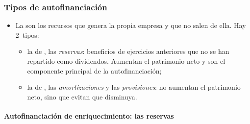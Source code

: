\documentclass[11pt]{article}
\begin{document}
\subsubsection{Tipos de autofinanciación}\label{sec:tipos-autofinanciacion}

\begin{itemize}
\item La  son los recursos que genera la propia empresa y que no salen de ella. Hay 2~tipos:
  \begin{itemize}
  \item la de , las \emph{reservas}: beneficios de ejercicios anteriores que no se han repartido como dividendos. Aumentan el patrimonio neto y son el componente principal de la autofinanciación;
  \item la de , las \emph{amortizaciones} y las \emph{provisiones}: no aumentan el patrimonio neto, sino que evitan que disminuya.
  \end{itemize}
\end{itemize}

\paragraph{Autofinanciación de enriquecimiento: las reservas}
\end{document}
